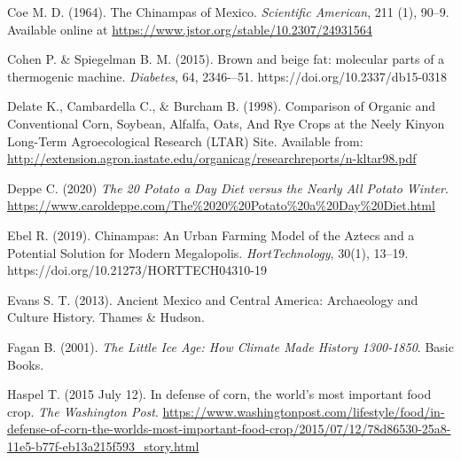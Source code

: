 \documentclass[jou]{apa7}
\begin{document}
\begin{thebibliography}{99}
Coe M. D.
(1964).
The Chinampas of Mexico.
\textit{Scientific American}, 211 (1), 90--9.
Available online at \url{https://www.jstor.org/stable/10.2307/24931564}


Cohen P. \& Spiegelman B. M.
(2015).
Brown and beige fat: molecular parts of a thermogenic machine.
\textit{Diabetes},
64,
2346-–51.
https://doi.org/10.2337/db15-0318

Delate K., Cambardella C., \& Burcham B.
(1998).
Comparison of Organic and Conventional Corn, 
Soybean, Alfalfa, Oats, And Rye Crops at the Neely Kinyon Long-Term Agroecological Research (LTAR) Site.
Available from: \url{http://extension.agron.iastate.edu/organicag/researchreports/n-kltar98.pdf} 


Deppe C.
(2020) 
\textit{The 20 Potato a Day Diet versus the Nearly All Potato Winter}.
\url{https://www.caroldeppe.com/The\%2020\%20Potato\%20a\%20Day\%20Diet.html}

Ebel R. 
(2019).
Chinampas: An Urban Farming Model of the Aztecs and a Potential Solution for Modern Megalopolis.
\textit{HortTechnology},
30(1), 13--19.
https://doi.org/10.21273/HORTTECH04310-19

Evans S. T.
(2013).
Ancient Mexico and Central America: Archaeology and Culture History.
Thames \& Hudson.

Fagan B.
(2001).
\textit{The Little Ice Age: How Climate Made History 1300-1850}.
Basic Books.

Haspel T.
(2015 July 12). 
In defense of corn, the world’s most important food crop.
\textit{The Washington Post}.
\url{https://www.washingtonpost.com/lifestyle/food/in-defense-of-corn-the-worlds-most-important-food-crop/2015/07/12/78d86530-25a8-11e5-b77f-eb13a215f593_story.html}


\end{thebibliography}
\end{document}
